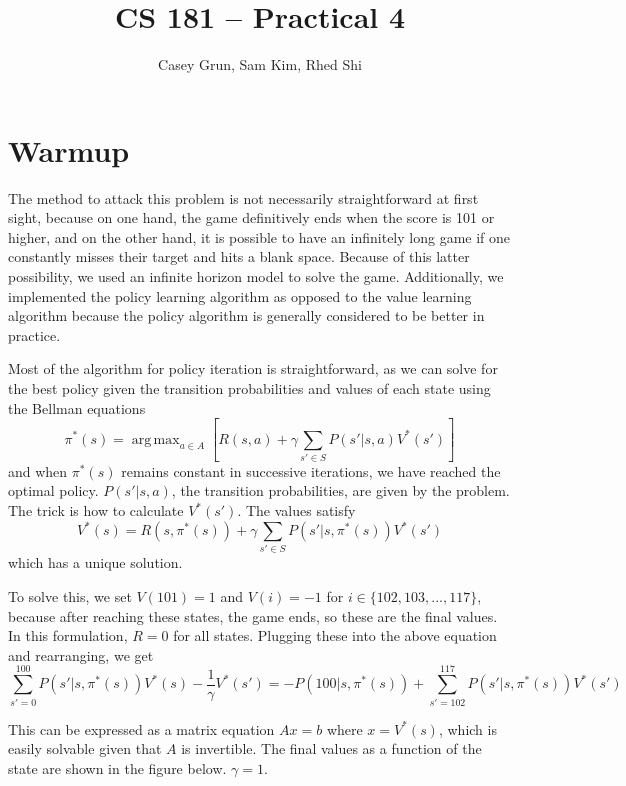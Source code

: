 \documentclass[11pt]{amsart}
\title{CS 181 -- Practical 4}
\author{Casey Grun, Sam Kim, Rhed Shi}
\DeclareMathOperator*{\argmax}{arg\,max}
\begin{document}
\maketitle

\section{Warmup}

The method to attack this problem is not necessarily straightforward at first sight, because on one hand, the game definitively ends when the score is 101 or higher, and on the other hand, it is possible to have an infinitely long game if one constantly misses their target and hits a blank space. Because of this latter possibility, we used an infinite horizon model to solve the game. Additionally, we implemented the policy learning algorithm as opposed to the value learning algorithm because the policy algorithm is generally considered to be better in practice.

Most of the algorithm for policy iteration is straightforward, as we can solve for the best policy given the transition probabilities and values of each state using the Bellman equations
$$\pi^*(s)=\argmax_{a\in A}\left[R(s,a)+\gamma\sum_{s'\in S} P(s'|s,a)V^*(s')\right]$$
and when $\pi^*(s)$ remains constant in successive iterations, we have reached the optimal policy. $P(s'|s,a)$, the transition probabilities, are given by the problem. The trick is how to calculate $V^*(s')$. The values satisfy
$$V^*(s)=R(s,\pi^*(s))+\gamma\sum_{s'\in S} P(s'|s,\pi^*(s))V^*(s')$$
which has a unique solution.

To solve this, we set $V(101)=1$ and $V(i)=-1$ for $i \in \{102,103,...,117\}$, because after reaching these states, the game ends, so these are the final values. In this formulation, $R=0$ for all states. Plugging these into the above equation and rearranging, we get
$$\sum_{s'=0}^{100} P(s'|s,\pi^*(s))V^*(s) - \frac{1}{\gamma}V^*(s')=-P(100|s,\pi^*(s))+\sum_{s'=102}^{117} P(s'|s,\pi^*(s))V^*(s')$$

This can be expressed as a matrix equation $Ax=b$ where $x=V^*(s)$, which is easily solvable given that $A$ is invertible. The final values as a function of the state are shown in the figure below. $\gamma=1$.
\end{document}
